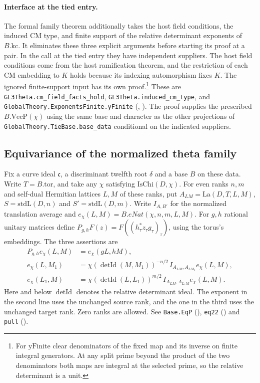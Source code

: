 \paragraph{Interface at the tied entry.}
The formal family theorem additionally takes the host field conditions,
the induced CM type, and finite support of the relative determinant
exponents of \(B.\mathrm{kc}\). It eliminates these three explicit
arguments before starting its proof at a pair. In the call at the
tied entry they have independent suppliers. The host field conditions
come from the host ramification theorem, and the restriction of each
CM embedding to \(K\) holds because its indexing automorphism fixes
\(K\). The ignored finite-support input has its own proof.\footnote{For
$\mathrm{yFinite}$ clear denominators of the fixed map and its inverse
on finite integral generators. At any split prime beyond the product
of the two denominators both maps are integral at the selected prime,
so the relative determinant is a unit.} These are
\nolinkurl{GL3Theta.cm_field_facts_hold},
\nolinkurl{GL3Theta.induced_cm_type}, and
\nolinkurl{GlobalTheory.ExponentsFinite.yFinite}
(,
).
The proof supplies the prescribed \(B.\mathrm{VecP}(\chi)\) using the
same base and character as the other projections of
\nolinkurl{GlobalTheory.TieBase.base_data} conditional on the indicated suppliers.

\subsection{Equivariance of the normalized theta family}\label{r14:equivariance}
Fix a curve ideal $\mathfrak c$, a discriminant twelfth root $\delta$ and a
base $B$ on these data. Write $T=B.\mathrm{tor}$, and take any $\chi$
satisfying $\mathrm{IsChi}(D,\chi)$. For even ranks $n,m$ and self-dual
Hermitian lattices $L,M$ of these ranks, put $A_{LM}=\mathrm{La}(D,T,L,M)$,
$S=\mathrm{stdL}(D,n)$ and $S'=\mathrm{stdL}(D,m)$. Write $I_{A,B'}$ for the
normalized translation average and $e_\chi(L,M)=B.eNat(\chi,n,m,L,M)$.
For $g,h$ rational unitary matrices define
$P_{g,h}F(z)=F((h_\tau^*z_\tau g_\tau)_\tau)$, using the torus's
embeddings. The three assertions are
\begin{align*}
 P_{g,h}e_\chi(L,M)&=e_\chi(gL,hM),\\
 e_\chi(L,M_1)&=\chi(\operatorname{detId}(M,M_1))^{-n/2}\,
 I_{A_{LM},A_{LM_1}}e_\chi(L,M),\\
 e_\chi(L_1,M)&=\chi(\operatorname{detId}(L,L_1))^{m/2}\,
 I_{A_{LM},A_{L_1M}}e_\chi(L,M).
\end{align*}
Here and below $\operatorname{detId}$ denotes the relative determinant ideal. The exponent
in the second line uses the unchanged source rank, and the one in the third
uses the unchanged target rank. Zero ranks are allowed. See
\nolinkurl{Base.EqP} (),
\nolinkurl{eq22} () and
\nolinkurl{pull} ().

